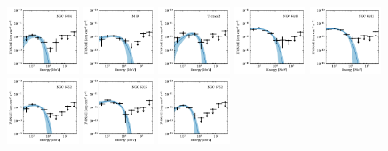 \documentclass[doublespace,nopageskip]{VTthesis}
\begin{document}
\begin{appendices}
\begin{figure}
\includegraphics[width=0.19\textwidth]{Figures/Globular/spectra/PLE_spectrum_12.pdf}
\includegraphics[width=0.19\textwidth]{Figures/Globular/spectra/PLE_spectrum_8.pdf}
\includegraphics[width=0.19\textwidth]{Figures/Globular/spectra/PLE_spectrum_28.pdf}
\includegraphics[width=0.19\textwidth]{Figures/Globular/spectra/PLE_spectrum_18.pdf}
\includegraphics[width=0.19\textwidth]{Figures/Globular/spectra/PLE_spectrum_19.pdf}
\includegraphics[width=0.19\textwidth]{Figures/Globular/spectra/PLE_spectrum_22.pdf}
\includegraphics[width=0.19\textwidth]{Figures/Globular/spectra/PLE_spectrum_13.pdf}
\includegraphics[width=0.19\textwidth]{Figures/Globular/spectra/PLE_spectrum_24.pdf}

\end{figure}
\end{appendices}
\end{document}
